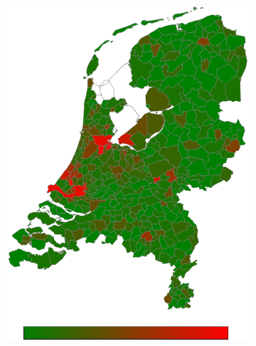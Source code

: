 \documentclass[a4paper,twoside,11pt]{article}
\begin{document}
\begin{figure}[h]
\begin{subfigure}[b]{0.118\textwidth}
                \includegraphics[width=\textwidth]{Heatmaps/HeatMap12.png}
                \caption{}
                \label{fig:notMentioned}
        \end{subfigure}
        \begin{subfigure}[b]{0.118\textwidth}

\end{subfigure}
\end{figure}
\end{document}
